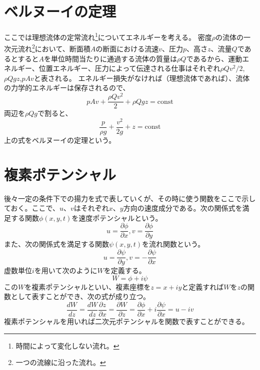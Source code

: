 \documentclass[10pt,b5paper,papersize,dvipdfmx]{jsbook}
\begin{document}
\section{ベルヌーイの定理}
ここでは理想流体の定常流れ\footnote{時間によって変化しない流れ。}についてエネルギーを考える。
密度$\rho$の流体の一次元流れ\footnote{一つの流線に沿った流れ。}において、断面積$A$の断面における流速$v$、圧力$p$、高さ$z$、流量$Q$であるとすると$A$を単位時間当たりに通過する流体の質量は$\rho Q$であるから、運動エネルギー、位置エネルギー、圧力によって伝達される仕事はそれぞれ$\rho Qv^2/2$,$\rho Qgz$,$pAv$と表される。
エネルギー損失がなければ（理想流体であれば）、流体の力学的エネルギーは保存されるので、
\begin{equation}
pAv+\frac{\rho Qv^2}{2}+\rho Qgz=\text{const}
\end{equation}
両辺を$\rho Qg$で割ると、
\begin{equation}
\frac{p}{\rho g}+\frac{v^2}{2g}+z=\text{const}
\end{equation}
上の式をベルヌーイの定理という。
\section{複素ポテンシャル}
後々一定の条件下での揚力を式で表していくが、その時に使う関数をここで示しておく。ここで、$u$、$v$はそれぞれ$x$、$y$方向の速度成分である。次の関係式を満足する関数$\phi(x,y,t)$を速度ポテンシャルという。
\begin{equation}
u=\frac{\partial\phi}{\partial x}, v=\frac{\partial\phi}{\partial y}
\end{equation}
また、次の関係式を満足する関数$\psi(x,y,t)$を流れ関数という。
\begin{equation}
u=\frac{\partial\psi}{\partial y}, v=-\frac{\partial\psi}{\partial x}
\end{equation}
虚数単位$i$を用いて次のように$W$を定義する。
\begin{equation}
W=\phi+i\psi
\end{equation}
この$W$を複素ポテンシャルといい、複素座標を$z=x+iy$と定義すれば$W$を$z$の関数として表すことができ、次の式が成り立つ。
\begin{equation}
\frac{dW}{dz}=\frac{dW}{dz}\frac{\partial z}{\partial x}=\frac{\partial W}{\partial z}=\frac{\partial\phi}{\partial x}+i\frac{\partial\psi}{\partial x}=u-iv
\end{equation}
複素ポテンシャルを用いれば二次元ポテンシャルを関数で表すことができる。
\end{document}
